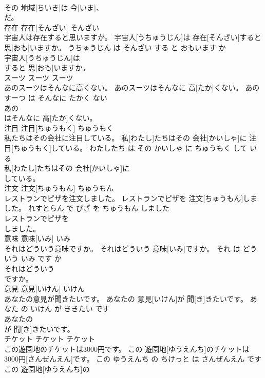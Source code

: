 \documentclass[8pt]{extreport}
\begin{document}
\begin{CJK}{UTF8}{min}
\\	その 地域[ちいき]は 今[いま]、
\\	だ。		
\\	存在	存在[そんざい]	そんざい	
\\	宇宙人は存在すると思いますか。	宇宙人[うちゅうじん]は 存在[そんざい]すると 思[おも]いますか。	うちゅうじん は そんざい する と おもいます か	
\\	宇宙人[うちゅうじん]は
\\	すると 思[おも]いますか。		
\\	スーツ	スーツ	スーツ	
\\	あのスーツはそんなに高くない。	あのスーツはそんなに 高[たか]くない。	あの すーつ は そんなに たかく ない	
\\	あの
\\	はそんなに 高[たか]くない。		
\\	注目	注目[ちゅうもく]	ちゅうもく	
\\	私たちはその会社に注目している。	私[わたし]たちはその 会社[かいしゃ]に 注目[ちゅうもく]している。	わたしたち は その かいしゃ に ちゅうもく して いる	
\\	私[わたし]たちはその 会社[かいしゃ]に
\\	している。		
\\	注文	注文[ちゅうもん]	ちゅうもん	
\\	レストランでピザを注文しました。	レストランでピザを 注文[ちゅうもん]しました。	れすとらん で ぴざ を ちゅうもん しました	
\\	レストランでピザを
\\	しました。		
\\	意味	意味[いみ]	いみ	
\\	それはどういう意味ですか。	それはどういう 意味[いみ]ですか。	それ は どういう いみ です か	
\\	それはどういう
\\	ですか。		
\\	意見	意見[いけん]	いけん	
\\	あなたの意見が聞きたいです。	あなたの 意見[いけん]が 聞[き]きたいです。	あなた の いけん が ききたい です	
\\	あなたの
\\	が 聞[き]きたいです。		
\\	チケット	チケット	チケット	
\\	この遊園地のチケットは3000円です。	この 遊園地[ゆうえんち]のチケットは 3000円[さんぜんえん]です。	この ゆうえんち の ちけっと は さんぜんえん です	
\\	この 遊園地[ゆうえんち]の

\end{CJK}
\end{document}
